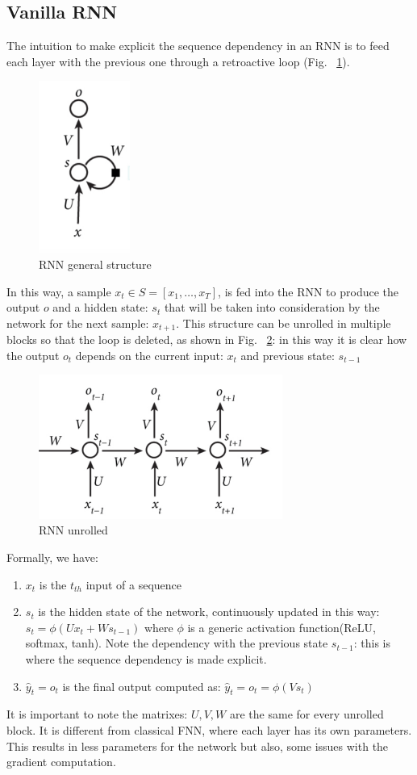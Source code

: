 \documentclass[LaM,binding=0.6cm]{sapthesis}
\begin{document}
\subsection{Vanilla RNN}
The intuition to make explicit the sequence dependency in an RNN is to feed each layer with the previous one through a retroactive loop (Fig. ~\ref{fig:rnnmod}).
\begin{figure}   \centering
    \includegraphics[width=30mm,scale=0.3]{rnnmod}
    \caption{RNN general structure \cite{recsite}}
    \label{fig:rnnmod}
\end{figure}
In this way, a sample $x_t \in S=[x_1,\dots,x_T]$, is fed into the RNN to produce the output $o$ and a hidden state: $s_t$ that will be taken into consideration by the network for the next sample: $x_{t+1}$. This structure can be unrolled in multiple blocks so that the loop is deleted, as shown in Fig. ~\ref{fig:unrolled}: in this way it is clear how the output $o_t$ depends on the current input: $x_t$ and previous state: $s_{t-1}$
\begin{figure}   \centering
    \includegraphics[width=80mm,scale=0.7]{unrolled}
    \caption{RNN unrolled \cite{recsite}}
    \label{fig:unrolled}
\end{figure}
Formally, we have:
\begin{enumerate}
\item $x_t$ is the $t_{th}$ input of a sequence
\item $s_t$ is the hidden state of the network, continuously updated in this way: $s_t = \phi\left(Ux_t + Ws_{t-1}\right)$ where $\phi$ is a generic activation function(ReLU, softmax, tanh). Note the dependency with the previous state $s_{t-1}$: this is where the sequence dependency is made explicit.
\item $\hat{y}_t=o_t$ is the final output computed as: $\hat{y}_t=o_t=\phi(Vs_t)$
\end{enumerate}
It is important to note the matrixes: $U,V,W$ are the same for every unrolled block. It is different from classical FNN, where each layer has its own  parameters. This results in less parameters for the network but also, some issues with the gradient computation.
\end{document}

